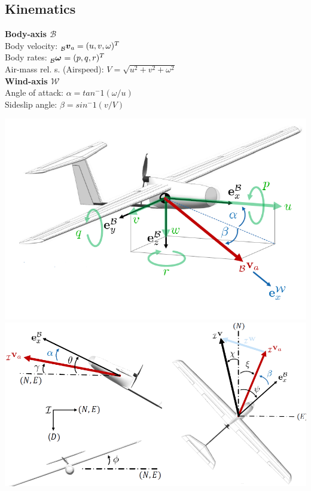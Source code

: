 \documentclass[a4paper, 8pt]{extarticle}
\newcommand{\mvec}[3]{  \prescript{}{\mathcal{#1}}{\bm{#2}}  _{#3} }
\begin{document}
\begin{multicols*}{3}




\subsection{Kinematics}
\textbf{Body-axis $\mathcal{B}$}\\
Body velocity: $\mvec{\mathcal{B}}{v}{a}=(u,v,\omega)^T$\\
Body rates: $\mvec{\mathcal{B}}{\omega}{}=(p,q,r)^T$\\
Air-mass rel. s. (Airspeed): $V=\sqrt{u^2+v^2+\omega^2}$\\
\textbf{Wind-axis $\mathcal{W}$}\\
Angle of attack: $\alpha=tan^-1(\omega/u)$\\
Sideslip angle: $\beta=sin^-1(v/V)$\\

\begin{center}
\includegraphics[width=0.9\linewidth]{images/FW_KinematicOverview.PNG}
\includegraphics[width=1\linewidth]{images/FW_Angles.png}
\end{center}


\end{multicols*}
\end{document}
